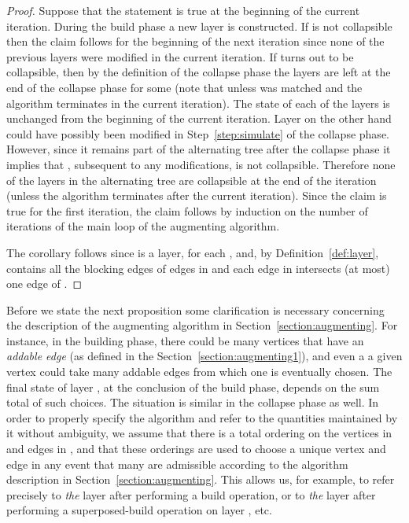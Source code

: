 \documentclass[11pt]{article}
\theoremstyle{definition}
\theoremstyle{remark}
\begin{document}
\begin{proof}
  Suppose that the statement is true at the beginning of the current
  iteration. During the build phase a new layer  is
  constructed. If  is not collapsible then the claim
  follows for the beginning of the next iteration since none of the
  previous layers were modified in the current iteration. If
   turns out to be collapsible, then by the definition of
  the collapse phase the layers  are left at the end of
  the collapse phase for some  (note that 
  unless  was matched and the algorithm terminates in the current
  iteration). The state of each of the layers  is
  unchanged from the beginning of the current iteration. Layer 
  on the other hand could have possibly been modified in
  Step~\ref{step:simulate} of the collapse phase. However, since it
  remains part of the alternating tree after the collapse phase it
  implies that , subsequent to any modifications, is not
  collapsible. Therefore none of the layers in the alternating tree
  are collapsible at the end of the iteration (unless the algorithm
  terminates after the current iteration). Since the claim is true for
  the first iteration, the claim follows by induction on the number of
  iterations of the main loop of the augmenting algorithm.

  The corollary follows since  is a layer, for each
  , and, by Definition~\ref{def:layer},  contains
  all the blocking edges of edges in  and each edge in 
  intersects (at most) one edge of .
\end{proof}

Before we state the next proposition some clarification is necessary
concerning the description of the augmenting algorithm in
Section~\ref{section:augmenting}. For instance, in the building phase,
there could be many vertices  that have an
\emph{addable edge} (as defined in the Section~\ref{section:augmenting1}), and
even a a given vertex could take many addable edges from which one is
eventually chosen. The final state of layer , at the
conclusion of the build phase, depends on the sum total of such
choices. The situation is similar in the collapse phase as well. In
order to properly specify the algorithm and refer to the quantities
maintained by it without ambiguity, we assume that there is a total
ordering on the vertices in  and edges in , and that
these orderings are used to choose a unique vertex and edge in any
event that many are admissible according to the algorithm description
in Section~\ref{section:augmenting}. This allows us, for example, to
refer precisely to \emph{the} layer  after performing a
build operation, or to \emph{the} layer  after performing a
superposed-build operation on layer , etc.
\end{document}
